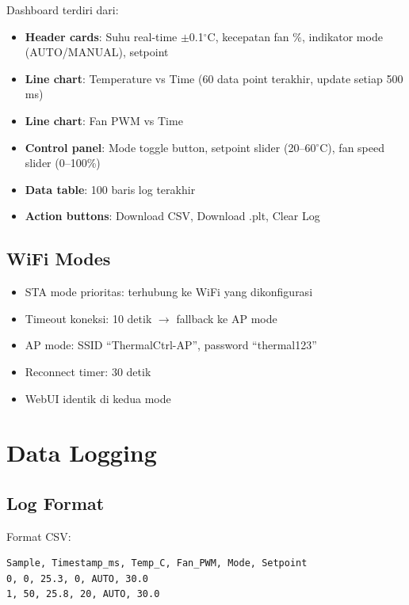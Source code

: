 \documentclass[11pt,a4paper]{article}
\begin{document}
\begin{center}
\end{center}

Dashboard terdiri dari:
\begin{itemize}
    \item \textbf{Header cards}: Suhu real-time $\pm$0.1$^{\circ}$C, kecepatan fan \%, indikator mode (AUTO/MANUAL), setpoint
    \item \textbf{Line chart}: Temperature vs Time (60 data point terakhir, update setiap 500\,ms)
    \item \textbf{Line chart}: Fan PWM vs Time
    \item \textbf{Control panel}: Mode toggle button, setpoint slider (20--60$^{\circ}$C), fan speed slider (0--100\%)
    \item \textbf{Data table}: 100 baris log terakhir
    \item \textbf{Action buttons}: Download CSV, Download .plt, Clear Log
\end{itemize}

\subsection{WiFi Modes}

\begin{itemize}
    \item STA mode prioritas: terhubung ke WiFi yang dikonfigurasi
    \item Timeout koneksi: 10 detik $\rightarrow$ fallback ke AP mode
    \item AP mode: SSID ``ThermalCtrl-AP'', password ``thermal123''
    \item Reconnect timer: 30 detik
    \item WebUI identik di kedua mode
\end{itemize}

\section{Data Logging}

\subsection{Log Format}

Format CSV:
\begin{verbatim}
Sample, Timestamp_ms, Temp_C, Fan_PWM, Mode, Setpoint
0, 0, 25.3, 0, AUTO, 30.0
1, 50, 25.8, 20, AUTO, 30.0
\end{verbatim}
\end{document}
